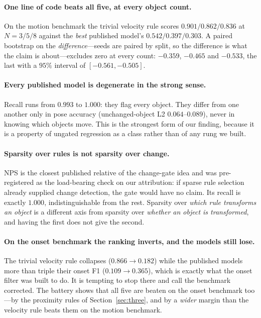 \documentclass{article}
\begin{document}
\paragraph{One line of code beats all five, at every object count.} On the motion benchmark the
trivial velocity rule scores $0.901 / 0.862 / 0.836$ at $N = 3/5/8$ against the \emph{best}
published model's $0.542 / 0.397 / 0.303$. A paired bootstrap on the \emph{difference}---seeds
are paired by split, so the difference is what the claim is about---excludes zero at every
count: $-0.359$, $-0.465$ and $-0.533$, the last with a $95\%$ interval of
$[-0.561, -0.505]$.

\paragraph{Every published model is degenerate in the strong sense.} Recall runs from $0.993$
to $1.000$: they flag every object. They differ from one another only in pose accuracy
(unchanged-object L2 $0.064$--$0.089$), never in knowing which objects move. This is the
strongest form of our finding, because it is a property of ungated regression as a class rather
than of any rung we built.

\paragraph{Sparsity over rules is not sparsity over change.} NPS is the closest published
relative of the change-gate idea and was pre-registered as the load-bearing check on our
attribution: if sparse rule selection already supplied change detection, the gate would have no
claim. Its recall is exactly $1.000$, indistinguishable from the rest. Sparsity over
\emph{which rule transforms an object} is a different axis from sparsity over \emph{whether an
object is transformed}, and having the first does not give the second.

\paragraph{On the onset benchmark the ranking inverts, and the models still lose.} The trivial
velocity rule collapses ($0.866 \rightarrow 0.182$) while the published models more than triple
their onset F1 ($0.109 \rightarrow 0.365$), which is exactly what the onset filter was built to
do. It is tempting to stop there and call the benchmark corrected. The battery shows that all five are beaten on the onset benchmark too---by the proximity rules
of Section~\ref{sec:three}, and by a \emph{wider} margin than the velocity rule beats them on
the motion benchmark.
\end{document}
